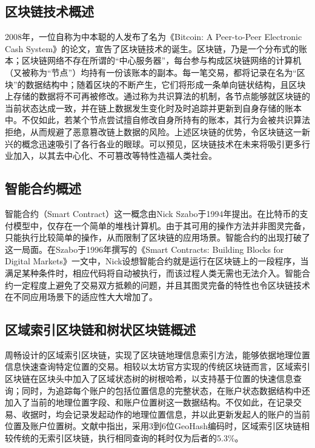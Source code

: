 \subsection{区块链技术概述}

2008年，一位自称为中本聪的人发布了名为《Bitcoin: A Peer-to-Peer Electronic Cash System》的论文，宣告了区块链技术的诞生。区块链，乃是一个分布式的账本；区块链网络不存在所谓的“中心服务器”，每台参与构成区块链网络的计算机（又被称为“节点”）均持有一份该账本的副本。每一笔交易，都将记录在名为“区块”的数据结构中；随着区块的不断产生，它们将形成一条单向链状结构，且区块上存储的数据将不可再被修改。通过称为共识算法的机制，各节点能够就区块链的当前状态达成一致，并在链上数据发生变化时及时追踪并更新到自身存储的账本中。不仅如此，若某个节点尝试擅自修改自身所持有的账本，其行为会被共识算法拒绝，从而规避了恶意篡改链上数据的风险。上述区块链的优势，令区块链这一新兴的概念迅速吸引了各行各业的眼球。可以预见，区块链技术在未来将吸引更多行业加入，以其去中心化、不可篡改等特性造福人类社会。

\subsection{智能合约概述}

智能合约（Smart Contract）这一概念由Nick Szabo于1994年提出。在比特币的支付模型中，仅存在一个简单的堆栈计算机。由于其可用的操作方法并非图灵完备，只能执行比较简单的操作，从而限制了区块链的应用场景。智能合约的出现打破了这一局面。在Szabo于1996年撰写的《Smart Contracts: Building Blocks for Digital Markets》一文\cite{nickSzabo}中，Nick设想智能合约就是运行在区块链上的一段程序，当满足某种条件时，相应代码将自动被执行，而该过程人类无需也无法介入。智能合约一定程度上避免了交易双方抵赖的问题，并且其图灵完备的特性也令区块链技术在不同应用场景下的适应性大大增加了。

\subsection{区域索引区块链和树状区块链概述}

周畅设计的区域索引区块链，实现了区块链地理信息索引方法，能够依据地理位置信息快速查询特定位置的交易\cite{sensors}。相较以太坊官方实现的传统区块链而言，区域索引区块链在区块头中加入了区域状态树的树根哈希，以支持基于位置的快速信息查询；同时，为追踪每个账户的包括位置信息的完整状态，在账户状态数据结构中还加入了当前的地理位置字段、和账户位置树这一数据结构。不仅如此，在记录交易、收据时，均会记录发起动作的地理位置信息，并以此更新发起人的账户的当前位置及账户位置树。文献\cite{sensors}中指出，采用3到6位GeoHash编码时，区域索引区块链相较传统的无索引区块链，执行相同查询的耗时仅为后者的5.3\%。

